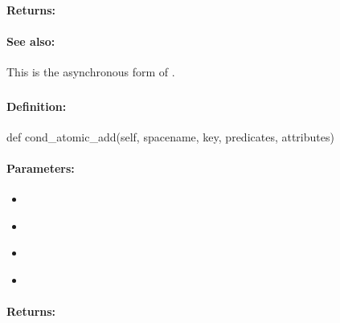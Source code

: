 \paragraph{Returns:}


\paragraph{See also:}  This is the asynchronous form of .

\pagebreak
\subsubsection{}
\label{api:python:cond_atomic_add}


\paragraph{Definition:}
\begin{pythoncode}
def cond_atomic_add(self, spacename, key, predicates, attributes)
\end{pythoncode}

\paragraph{Parameters:}
\begin{itemize}[noitemsep]
\item {}\\

\item {}\\

\item {}\\

\item {}\\

\end{itemize}

\paragraph{Returns:}


